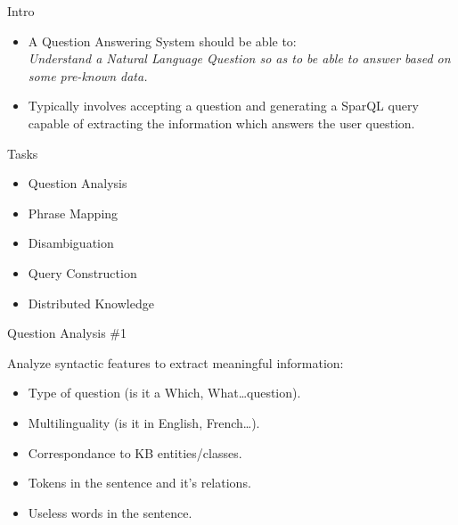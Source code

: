 \documentclass{beamer}
\begin{document}
\begin{frame}{Intro}
  \begin{card}
    \begin{itemize}
      \item A Question Answering System should be able to: \\
      \textit{Understand a Natural Language Question so as to be able to answer based on some pre-known data.}
    \end{itemize}
  \end{card}
  \begin{card}
    \begin{itemize}
      \item Typically involves accepting a question and generating a SparQL query capable of extracting the information which answers the user question.
    \end{itemize}
  \end{card}
\end{frame}

\begin{frame}{Tasks}
  \begin{card}
    \begin{itemize}
      \item Question Analysis
      \item Phrase Mapping
      \item Disambiguation
      \item Query Construction
      \item Distributed Knowledge
    \end{itemize}
  \end{card}
\end{frame}

\begin{frame}{Question Analysis \#1}
  \begin{card}
    Analyze syntactic features to extract meaningful information:
    \begin{itemize}
      \item Type of question (is it a Which, What\dots question).
      \item Multilinguality (is it in English, French\dots).
      \item Correspondance to KB entities/classes.
      \item Tokens in the sentence and it's relations.
      \item Useless words in the sentence.
    \end{itemize}
  \end{card}
\end{frame}
\end{document}
